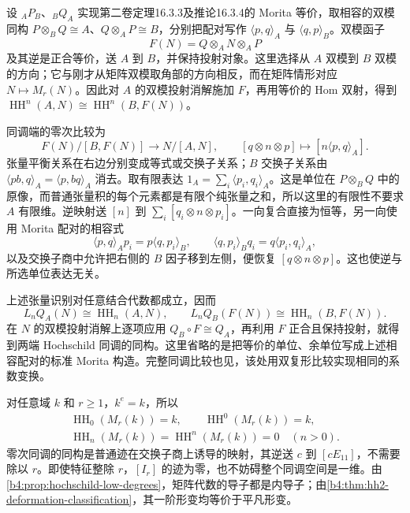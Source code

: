\begin{proofsketch}
	设 \({}_AP_B\)、\({}_BQ_A\) 实现第二卷定理16.3.3及推论16.3.4的 Morita 等价，取相容的双模同构 \(P\otimes_BQ\cong A\)、\(Q\otimes_AP\cong B\)，分别把配对写作 \(\langle p,q\rangle_A\) 与 \(\langle q,p\rangle_B\)。双模函子
	\[
		F(N)=Q\otimes_AN\otimes_AP
	\]
	及其逆是正合等价，送 \(A\) 到 \(B\)，并保持投射对象。这里选择从 \(A\) 双模到 \(B\) 双模的方向；它与刚才从矩阵双模取角部的方向相反，而在矩阵情形对应 \(N\mapsto M_r(N)\)。因此对 \(A\) 的双模投射消解施加 \(F\)，再用等价的 Hom 双射，得到 \(\operatorname{HH}^n(A,N)\cong\operatorname{HH}^n(B,F(N))\)。

	同调端的零次比较为
	\[
		F(N)/[B,F(N)]\longrightarrow N/[A,N],\qquad [q\otimes n\otimes p]\longmapsto [n\langle p,q\rangle_A].
	\]
	张量平衡关系在右边分别变成等式或交换子关系；\(B\) 交换子关系由 \(\langle pb,q\rangle_A=\langle p,bq\rangle_A\) 消去。取有限表达 \(1_A=\sum_i\langle p_i,q_i\rangle_A\)。这是单位在 \(P\otimes_BQ\) 中的原像，而普通张量积的每个元素都是有限个纯张量之和，所以这里的有限性不要求 \(A\) 有限维。逆映射送 \([n]\) 到 \(\sum_i[q_i\otimes n\otimes p_i]\)。一向复合直接为恒等，另一向使用 Morita 配对的相容式
	\[
		\langle p,q\rangle_Ap_i=p\langle q,p_i\rangle_B, \qquad \langle q,p_i\rangle_Bq_i=q\langle p_i,q_i\rangle_A,
	\]
	以及交换子商中允许把右侧的 \(B\) 因子移到左侧，便恢复 \([q\otimes n\otimes p]\)。这也使逆与所选单位表达无关。

	上述张量识别对任意结合代数都成立，因而
	\[
		L_nQ_A(N)\cong\operatorname{HH}_n(A,N), \qquad L_nQ_B(F(N))\cong\operatorname{HH}_n(B,F(N)).
	\]
	在 \(N\) 的双模投射消解上逐项应用 \(Q_B\circ F\cong Q_A\)，再利用 \(F\) 正合且保持投射，就得到两端 Hochschild 同调的同构。这里省略的是把等价的单位、余单位写成上述相容配对的标准 Morita 构造。完整同调比较也见\cite[Theorem 9.5.6, pp. 328--329]{Weibel1994HomologicalAlgebra}，该处用双复形比较实现相同的系数变换。
\end{proofsketch}

\begin{example}\label{b4:exm:matrix-hochschild-vanishing}
	对任意域 \(k\) 和 \(r\ge1\)，\(k^e=k\)，所以
	\[
		\begin{gathered}
			\operatorname{HH}_0(M_r(k))=k,\qquad \operatorname{HH}^0(M_r(k))=k,\\
			\operatorname{HH}_n(M_r(k))=\operatorname{HH}^n(M_r(k))=0\quad(n>0).
		\end{gathered}
	\]
	零次同调的同构是普通迹在交换子商上诱导的映射，其逆送 \(c\) 到 \([cE_{11}]\)，不需要除以 \(r\)。即使特征整除 \(r\)，\([I_r]\) 的迹为零，也不妨碍整个同调空间是一维。由\cref{b4:prop:hochschild-low-degrees}，矩阵代数的导子都是内导子；由\cref{b4:thm:hh2-deformation-classification}，其一阶形变均等价于平凡形变。
\end{example}

